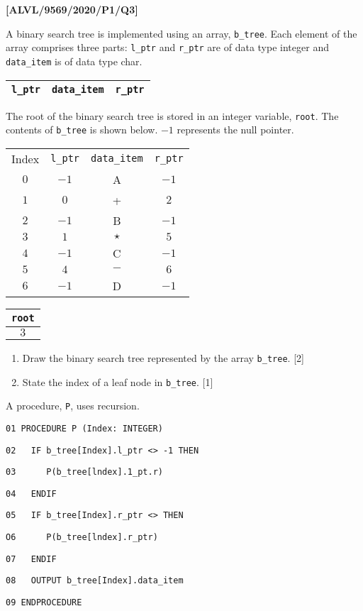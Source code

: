 \item \textbf{{[}ALVL/9569/2020/P1/Q3{]} }

A binary search tree is implemented using an array, \texttt{b\_tree}.
Each element of the array comprises three parts: \texttt{l\_ptr} and
\texttt{r\_ptr} are of data type integer and \texttt{data\_item} is
of data type char. 
\begin{center}
\begin{tabular}{|c|c|c|}
\hline 
\texttt{l\_ptr} & \texttt{data\_item} & \texttt{r\_ptr}\tabularnewline
\hline 
\end{tabular}
\par\end{center}

The root of the binary search tree is stored in an integer variable,
\texttt{root}. The contents of \texttt{b\_tree} is shown below. $-1$
represents the null pointer. 
\begin{center}
\begin{tabular}{c|c|c|c|}
\cline{2-4} \cline{3-4} \cline{4-4} 
Index & \texttt{l\_ptr} & \texttt{data\_item} & \texttt{r\_ptr}\tabularnewline
\cline{2-4} \cline{3-4} \cline{4-4} 
$0$ & $-1$ & A & $-1$\tabularnewline
\cline{2-4} \cline{3-4} \cline{4-4} 
$1$ & $0$ & + & $2$\tabularnewline
\cline{2-4} \cline{3-4} \cline{4-4} 
$2$ & $-1$ & B & $-1$\tabularnewline
\cline{2-4} \cline{3-4} \cline{4-4} 
$3$ & $1$ & $\star$ & $5$\tabularnewline
\cline{2-4} \cline{3-4} \cline{4-4} 
$4$ & $-1$ & C & $-1$\tabularnewline
\cline{2-4} \cline{3-4} \cline{4-4} 
$5$ & $4$ & $-$ & $6$\tabularnewline
\cline{2-4} \cline{3-4} \cline{4-4} 
$6$ & $-1$ & D & $-1$\tabularnewline
\cline{2-4} \cline{3-4} \cline{4-4} 
\end{tabular}\qquad{}\qquad{} %
\begin{tabular}{|c|}
\hline 
\texttt{root}\tabularnewline
\hline 
\hline 
$3$\tabularnewline
\hline 
\end{tabular}
\par\end{center}
\begin{enumerate}
\item Draw the binary search tree represented by the array \texttt{b\_tree}.\hfill{}
{[}2{]}
\item State the index of a leaf node in \texttt{b\_tree}.\hfill{} {[}1{]}
\end{enumerate}
A procedure, \texttt{P}, uses recursion.

\begin{algorithm}[H]
\texttt{01 PROCEDURE P (Index: INTEGER)}

\texttt{02 ~~IF b\_tree{[}Index{]}.l\_ptr <> -1 THEN}

\texttt{03 ~~~~~P(b\_tree{[}lndex{]}.1\_pt.r)}

\texttt{04 ~~ENDIF}

\texttt{05 ~~IF b\_tree{[}Index{]}.r\_ptr <>  THEN}

\texttt{O6 ~~~~~P(b\_tree{[}lndex{]}.r\_ptr)}

\texttt{07 ~~ENDIF}

\texttt{08 ~~OUTPUT b\_tree{[}Index{]}.data\_item}

\texttt{09 ENDPROCEDURE}
\end{algorithm}

